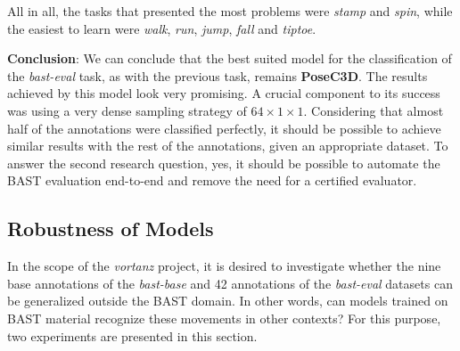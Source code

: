 \documentclass[extern,palatino]{cgMA}
\begin{document}
All in all, the tasks that presented the most problems were \textit{stamp} and \textit{spin}, while the easiest to learn were \textit{walk}, \textit{run}, \textit{jump}, \textit{fall} and \textit{tiptoe}.

\bigskip \bigskip
\noindent\textbf{Conclusion}: We can conclude that the best suited model for the classification of the \textit{bast-eval} task, as with the previous task, remains \textbf{PoseC3D}. The results achieved by this model look very promising. A crucial component to its success was using a very dense sampling strategy of \textit{$64 \times 1 \times 1$}. Considering that almost half of the annotations were classified perfectly, it should be possible to achieve similar results with the rest of the annotations, given an appropriate dataset. To answer the second research question, yes, it should be possible to automate the BAST evaluation end-to-end and remove the need for a certified evaluator.

\newpage
\subsection{Robustness of Models}
\label{research_question_3}


\bigskip \bigskip
\noindent In the scope of the \textit{vortanz} project, it is desired to investigate whether the nine base annotations of the \textit{bast-base} and 42 annotations of the \textit{bast-eval} datasets can be generalized outside the BAST domain. In other words, can models trained on BAST material recognize these movements in other contexts? For this purpose, two experiments are presented in this section.
\end{document}

